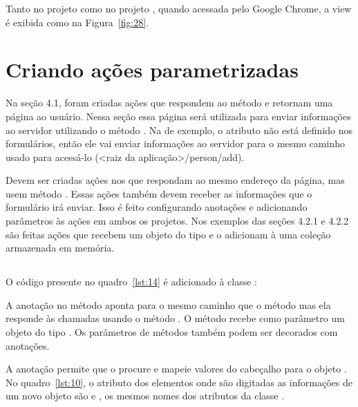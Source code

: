 Tanto no projeto  como no projeto , quando acessada pelo Google Chrome, a view é exibida como na Figura~\ref{fig:28}. 


\section{Criando ações parametrizadas}

Na seção 4.1, foram criadas ações que respondem ao método  e retornam uma página ao usuário. Nessa seção essa página será utilizada para enviar informações ao servidor utilizando o método . Na  de exemplo, o atributo  não está definido nos formulários, então ele vai enviar informações ao servidor para o mesmo caminho usado para acessá-lo (<raiz da aplicação>/person/add).

Devem ser criadas ações nos  que respondam ao mesmo endereço da página, mas usem método . Essas ações também devem receber as informações que o formulário irá enviar. Isso é feito configurando anotações e adicionando parâmetros às ações em ambos os projetos. Nos exemplos das seções 4.2.1 e 4.2.2 são feitas ações que recebem um objeto do tipo  e o adicionam à uma coleção armazenada em memória.

\subsection{}

O código presente no quadro~\ref{lst:14} é adicionado à classe :


A anotação  no método  aponta para o mesmo caminho que o método  mas ela responde às chamadas usando o método . O método  recebe como parâmetro um objeto do tipo . Os parâmetros de métodos também podem ser decorados com anotações.

A anotação  permite que o  procure e mapeie valores do cabeçalho  para o objeto . No quadro~\ref{lst:10}, o atributo  dos elementos  onde são digitadas as informações de um novo objeto são  e , os mesmos nomes dos atributos da classe .

